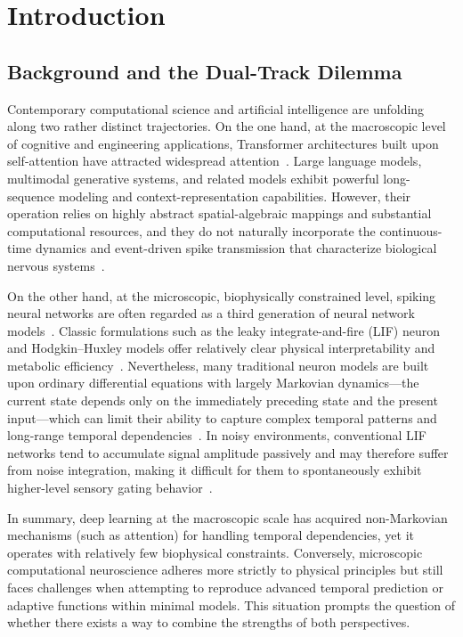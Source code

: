 \section{Introduction}\label{sec:intro}

\subsection{Background and the Dual-Track Dilemma}

Contemporary computational science and artificial intelligence are unfolding along two rather distinct trajectories. On the one hand, at the macroscopic level of cognitive and engineering applications, Transformer architectures built upon self-attention have attracted widespread attention~\cite{vaswani2017,brown2020,lin2022survey}. Large language models, multimodal generative systems, and related models exhibit powerful long-sequence modeling and context-representation capabilities. However, their operation relies on highly abstract spatial-algebraic mappings and substantial computational resources, and they do not naturally incorporate the continuous-time dynamics and event-driven spike transmission that characterize biological nervous systems~\cite{hassabis2017,markram2015}.

On the other hand, at the microscopic, biophysically constrained level, spiking neural networks are often regarded as a third generation of neural network models~\cite{maass1997}. Classic formulations such as the leaky integrate-and-fire (LIF) neuron and Hodgkin--Huxley models offer relatively clear physical interpretability and metabolic efficiency~\cite{gerstner2014}. Nevertheless, many traditional neuron models are built upon ordinary differential equations with largely Markovian dynamics---the current state depends only on the immediately preceding state and the present input---which can limit their ability to capture complex temporal patterns and long-range temporal dependencies~\cite{eshraghian2021}. In noisy environments, conventional LIF networks tend to accumulate signal amplitude passively and may therefore suffer from noise integration, making it difficult for them to spontaneously exhibit higher-level sensory gating behavior~\cite{davies2018,frenkel2023}.

In summary, deep learning at the macroscopic scale has acquired non-Markovian mechanisms (such as attention) for handling temporal dependencies, yet it operates with relatively few biophysical constraints. Conversely, microscopic computational neuroscience adheres more strictly to physical principles but still faces challenges when attempting to reproduce advanced temporal prediction or adaptive functions within minimal models. This situation prompts the question of whether there exists a way to combine the strengths of both perspectives.

